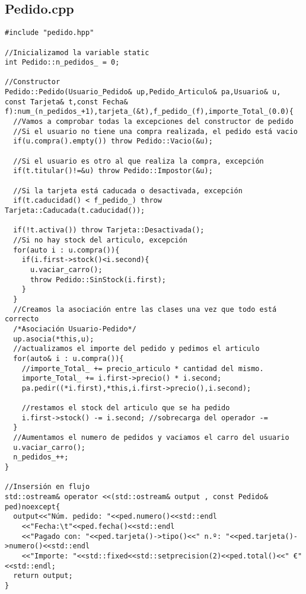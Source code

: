 \subsection{Pedido.cpp}
\begin{verbatim}
#include "pedido.hpp"

//Inicializamod la variable static
int Pedido::n_pedidos_ = 0;

//Constructor
Pedido::Pedido(Usuario_Pedido& up,Pedido_Articulo& pa,Usuario& u, const Tarjeta& t,const Fecha& f):num_(n_pedidos_+1),tarjeta_(&t),f_pedido_(f),importe_Total_(0.0){
  //Vamos a comprobar todas la excepciones del constructor de pedido
  //Si el usuario no tiene una compra realizada, el pedido está vacio
  if(u.compra().empty()) throw Pedido::Vacio(&u);

  //Si el usuario es otro al que realiza la compra, excepción
  if(t.titular()!=&u) throw Pedido::Impostor(&u);

  //Si la tarjeta está caducada o desactivada, excepción
  if(t.caducidad() < f_pedido_) throw Tarjeta::Caducada(t.caducidad());

  if(!t.activa()) throw Tarjeta::Desactivada();
  //Si no hay stock del articulo, excepción
  for(auto i : u.compra()){
    if(i.first->stock()<i.second){
      u.vaciar_carro();
      throw Pedido::SinStock(i.first);
    }
  }
  //Creamos la asociación entre las clases una vez que todo está correcto
  /*Asociación Usuario-Pedido*/
  up.asocia(*this,u);
  //actualizamos el importe del pedido y pedimos el articulo
  for(auto& i : u.compra()){
    //importe_Total_ += precio_articulo * cantidad del mismo.
    importe_Total_ += i.first->precio() * i.second;
    pa.pedir((*i.first),*this,i.first->precio(),i.second);

    //restamos el stock del articulo que se ha pedido
    i.first->stock() -= i.second; //sobrecarga del operador -=
  }
  //Aumentamos el numero de pedidos y vaciamos el carro del usuario
  u.vaciar_carro();
  n_pedidos_++;
}

//Insersión en flujo
std::ostream& operator <<(std::ostream& output , const Pedido& ped)noexcept{
  output<<"Núm. pedido: "<<ped.numero()<<std::endl
    <<"Fecha:\t"<<ped.fecha()<<std::endl
    <<"Pagado con: "<<ped.tarjeta()->tipo()<<" n.º: "<<ped.tarjeta()->numero()<<std::endl
    <<"Importe: "<<std::fixed<<std::setprecision(2)<<ped.total()<<" €"<<std::endl;
  return output;
}
  
\end{verbatim}

